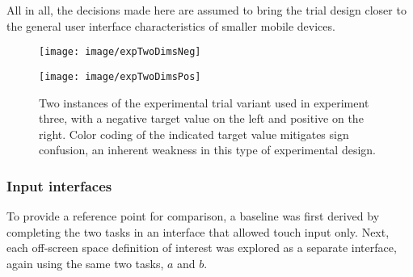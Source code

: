All in all, the decisions made here are assumed to bring the trial design  closer to the general user interface characteristics of smaller mobile devices. 


\begin{figure*}
	\centering
	\begin{minipage}[b]{0.484\textwidth} %
		\texttt{[image: image/expTwoDimsNeg]}
	\end{minipage}
	\begin{minipage}[b]{0.5\textwidth}
		\texttt{[image: image/expTwoDimsPos]}
	\end{minipage}
	\caption{Two instances of the experimental trial variant used in experiment three, with a negative target value on the left and positive on the right. Color coding of the indicated target value mitigates sign confusion, an inherent weakness in this type of experimental design.}
	\label{fig:expTwoDimsPosNeg}
\end{figure*}

\subsubsection{Input interfaces}

To provide a reference point for comparison, a baseline was first derived by completing the two tasks in an interface that allowed touch input only. Next, each off-screen space definition of interest was explored as a separate interface, again using the same two tasks, $a$ and $b$. 







